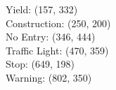 Yield: (157, 332) \\
Construction: (250, 200) \\
No Entry: (346, 444) \\
Traffic Light: (470, 359) \\
Stop: (649, 198) \\
Warning: (802, 350) \\